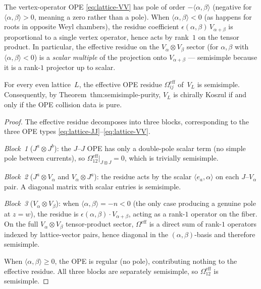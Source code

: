 \documentclass[11pt]{article}
\begin{document}
The vertex-operator OPE \eqref{eq:lattice-VV} has pole
of order $-\langle\alpha,\beta\rangle$ (negative for
$\langle\alpha,\beta\rangle > 0$, meaning a zero rather
than a pole).  When $\langle\alpha,\beta\rangle < 0$
(as happens for roots in opposite Weyl chambers), the
residue coefficient $\epsilon(\alpha,\beta)\,V_{\alpha+\beta}$
is proportional to a single vertex operator, hence acts by
rank~$1$ on the tensor product.
In particular, the effective residue on the
$V_\alpha \otimes V_\beta$ sector (for $\alpha,\beta$
with $\langle\alpha,\beta\rangle < 0$) is a \emph{scalar
multiple} of the projection onto $V_{\alpha+\beta}$ ---
semisimple because it is a rank-$1$ projector up to scalar.

\begin{proposition}
\label{prop:lattice-semisimple}
For every even lattice~$L$, the effective OPE residue
$\Omega_{ij}^{\mathrm{eff}}$ of~$V_L$ is semisimple.
Consequently, by Theorem~thm:semisimple-purity,
$V_L$ is chirally Koszul if and only if the OPE collision data
is pure.
\end{proposition}

\begin{proof}
The effective residue decomposes into three blocks,
corresponding to the three OPE types
\eqref{eq:lattice-JJ}--\eqref{eq:lattice-VV}.

\emph{Block~1} ($J^a \otimes J^b$):
the $J$--$J$ OPE has only a double-pole scalar term
(no simple pole between currents), so
$\Omega_{12}^{\mathrm{eff}}|_{J \otimes J} = 0$, which
is trivially semisimple.

\emph{Block~2} ($J^a \otimes V_\alpha$ and
$V_\alpha \otimes J^a$):
the residue acts by the scalar
$\langle e_a, \alpha\rangle$
on each $J$--$V_\alpha$ pair.  A diagonal matrix with
scalar entries is semisimple.

\emph{Block~3} ($V_\alpha \otimes V_\beta$):
when $\langle\alpha,\beta\rangle = -n < 0$ (the only case
producing a genuine pole at $z = w$), the residue is
$\epsilon(\alpha,\beta)\cdot V_{\alpha+\beta}$, acting
as a rank-$1$ operator on the fiber.  On the full
$V_\alpha \otimes V_\beta$ tensor-product sector,
$\Omega^{\mathrm{eff}}$ is a direct sum of rank-$1$
operators indexed by lattice-vector pairs, hence diagonal
in the $(\alpha,\beta)$-basis and therefore semisimple.

When $\langle\alpha,\beta\rangle \geq 0$, the OPE is
regular (no pole), contributing nothing to the effective
residue.  All three blocks are separately semisimple, so
$\Omega_{12}^{\mathrm{eff}}$ is semisimple.
\end{proof}
\end{document}
